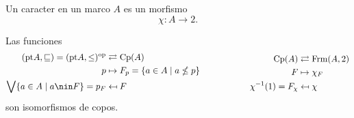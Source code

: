
\begin{defn}
    Un caracter en un marco $A$ es un morfismo
    \[
        \chi:A\to 2
    .\]
\end{defn}

\begin{thm}
    Las funciones
    \[
        \begin{aligned}
            (\pt A,\sqsubseteq)
            =(\pt A,\leq)^\op &\rightleftarrows \Cp(A) \\
            p &\mapsto F_p=\{a\in A\mid a\nleq p\} \\
            \Sup\{a\in A\mid a\nin F\} = p_F &\mapsfrom F
        \end{aligned}
        \hspace{20mm}
        \begin{aligned}
            \Cp(A) &\rightleftarrows \Frm(A,2) \\
            F &\mapsto \chi_F \\
            \chi^{-1}(1) = F_\chi &\mapsfrom \chi
        \end{aligned}
    \]
    son isomorfismos de copos.
\end{thm}
